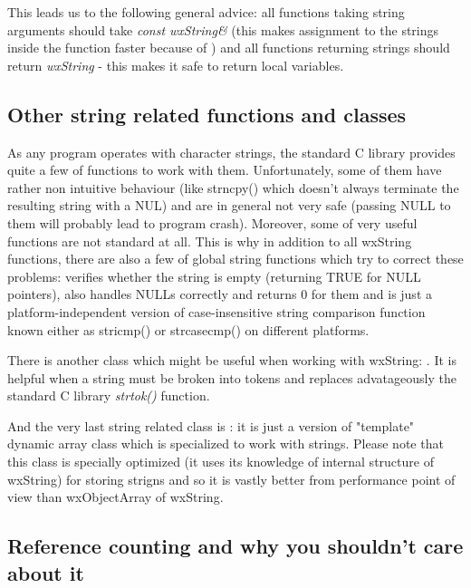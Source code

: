 This leads us to the following general advice: all functions taking string
arguments should take {\it const wxString\&} (this makes assignment to the
strings inside the function faster because of 
) and all functions returning
strings should return {\it wxString} - this makes it safe to return local
variables.

\subsection{Other string related functions and classes}

As any program operates with character strings, the standard C library provides quite a
few of functions to work with them. Unfortunately, some of them have rather non
intuitive behaviour (like strncpy() which doesn't always terminate the resulting
string with a NUL) and are in general not very safe (passing NULL to them will
probably lead to program crash). Moreover, some of very useful functions are not
standard at all. This is why in addition to all wxString functions, there are
also a few of global string functions which try to correct these problems:
 verifies whether the string is empty (returning
TRUE for NULL pointers),  also handles NULLs correctly
and returns 0 for them and  is just a
platform-independent version of case-insensitive string comparison function
known either as stricmp() or strcasecmp() on different platforms.

There is another class which might be useful when working with wxString: 
. It is helpful when a string must
be broken into tokens and replaces advatageously the standard C library {\it
strtok()} function.

And the very last string related class is : it
is just a version of "template" dynamic array class which is specialized to work
with strings. Please note that this class is specially optimized (it uses its
knowledge of internal structure of wxString) for storing strigns and so it is
vastly better from performance point of view than wxObjectArray of wxString.

\subsection{Reference counting and why you shouldn't care about it}\label{wxstringrefcount}

